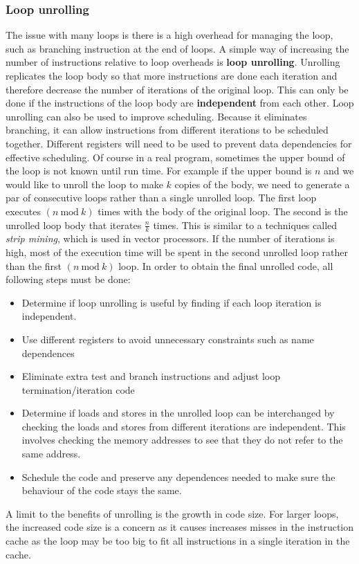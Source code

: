\documentclass[11pt]{article}
\begin{document}
\subsubsection{Loop unrolling}
The issue with many loops is there is a high overhead for managing the loop, such as branching instruction at the end of loops. A simple way of increasing the number of instructions relative to loop overheads is \textbf{loop unrolling}. Unrolling replicates the loop body so that more instructions are done each iteration and therefore decrease the number of iterations of the original loop. This can only be done if the instructions of the loop body are \textbf{independent} from each other. 
\n
Loop unrolling can also be used to improve scheduling. Because it eliminates branching, it can allow instructions from different iterations to be scheduled together. Different registers will need to be used to prevent data dependencies for effective scheduling. 
\n
Of course in a real program, sometimes the upper bound of the loop is not known until run time. For example if the  upper bound is $n$ and we would like to unroll the loop to make $k$ copies of the body, we need to generate a par of consecutive loops rather than a single unrolled loop. The first loop executes $(n\ \text{mod}\ k)$ times with the body of the original loop. The second is the unrolled loop body that iterates $\frac{n}{k}$ times. This is similar to a techniques called \textit{strip mining}, which is used in vector processors. If the number of iterations is high, most of the execution time will be spent in the second unrolled loop rather than the first $(n\ \text{mod}\ k)$ loop.
\n
In order to obtain the final unrolled code, all following steps must be done:
\begin{itemize}
\item Determine if loop unrolling is useful by finding if each loop iteration is independent.
\item Use different registers to avoid unnecessary constraints such as name dependences
\item Eliminate extra test and branch instructions and adjust loop termination/iteration code
\item Determine if loads and stores in the unrolled loop can be interchanged by checking the loads and stores from different iterations are independent. This involves checking the memory addresses to see that they do not refer to the same address.
\item Schedule the code and preserve any dependences needed to make sure the behaviour of the code stays the same.
\end{itemize}
\noindent
A limit to the benefits of unrolling is the growth in code size. For larger loops, the increased code size is a concern as it causes increases misses in the instruction cache as the loop may be too big to fit all instructions in a single iteration in the cache.
\end{document}
